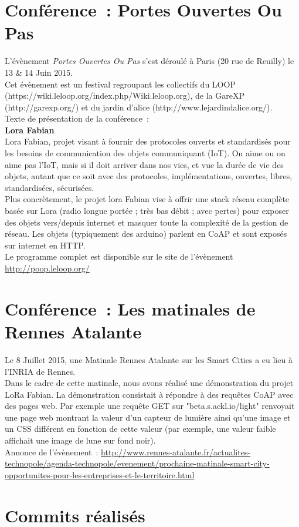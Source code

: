 \documentclass{article}
\begin{document}
	\section{Conférence~: Portes Ouvertes Ou Pas}
L'évènement \emph{Portes Ouvertes Ou Pas} s'est déroulé à Paris (20 rue de Reuilly) le 13 \& 14 Juin 2015.\\
Cet évènement est un festival regroupant les collectifs du LOOP (https://wiki.leloop.org/index.php/Wiki.leloop.org), de la GareXP (http://garexp.org/) et du jardin d'alice (http://www.lejardindalice.org/).\\
Texte de présentation de la conférence~:\\
\textbf{Lora Fabian}\\
    Lora Fabian, projet visant à fournir des protocoles ouverts et standardisés pour les besoins de communication des objets communiquant (IoT). On aime ou on aime pas l'IoT, mais si il doit arriver dans nos vies, et vue la durée de vie des objets, autant que ce soit avec des protocoles, implémentations, ouvertes, libres, standardisées, sécurisées.\\
    Plus concrètement, le projet lora Fabian vise à offrir une stack réseau complète basée sur Lora (radio longue portée ; très bas débit ; avec pertes) pour exposer des objets vers/depuis internet et masquer toute la complexité de la gestion de réseau. Les objets (typiquement des arduino) parlent en CoAP et sont exposés sur internet en HTTP.\\
Le programme complet est disponible sur le site de l'évènement \url{http://poop.leloop.org/}
	\section{Conférence~: Les matinales de Rennes Atalante}
Le 8 Juillet 2015, une Matinale Rennes Atalante sur les Smart Cities a eu lieu à l'INRIA de Rennes.\\
Dans le cadre de cette matinale, nous avons réalisé une démonstration du projet LoRa Fabian. La démonstration consistait à répondre à des requêtes CoAP avec des pages web. Par exemple une requête GET sur "beta.s.ackl.io/light" renvoyait une page web montrant la valeur d'un capteur de lumière ainsi qu'une image et un CSS différent en fonction de cette valeur (par exemple, une valeur faible affichait une image de lune sur fond noir).\\
Annonce de l'évènement~: \url{http://www.rennes-atalante.fr/actualites-technopole/agenda-technopole/evenement/prochaine-matinale-smart-city-opportunites-pour-les-entreprises-et-le-territoire.html}
	\section{Commits réalisés}
\end{document}
